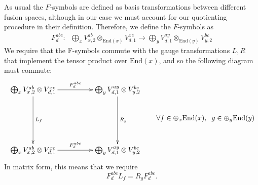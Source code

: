 \documentclass[12pt,a4paper]{article}
\newcounter{arrow}
\newcommand{\tp}{\otimes}
\newcommand\be            {\begin{equation}}
\newcommand\ee            {\end{equation}}
\newcommand{\End}{\text{End}}
\begin{document}
As usual the $F$-symbols are defined as basis transformations between different fusion spaces, although in our case we must account for our quotienting procedure in their definition. Therefore, we define the $F$-symbols as
\begin{align}
F^{abc}_d: \; \; \bigoplus_x V^{ab}_{x,2} \tp_{\text{End}(x)} V^{xc}_{d,1} \rightarrow \bigoplus_y V^{ay}_{d,1} \tp_{\text{End}(y)} V^{bc}_{y,2}
\end{align}
We require that the F-symbols commute with the gauge transformations $L,R$ that implement the tensor product over $\End(x)$, and so the following diagram must commute:
\begin{align}
	\vcenter{\xymatrix @!0 @M=1mm @R=30mm @C=42mm{
		 \bigoplus_x V^{ab}_{x,2} \otimes V^{xc}_{d,1} \ar[d]^{L_{f}}\ar[r]^{F^{abc}_d}& \bigoplus_y V^{ay}_{d,1} \otimes V^{bc}_{y,2} \ar[d]^{R_{g}} \\
		\bigoplus_x V^{ab}_{x,2} \otimes V^{xc}_{d,1}  \ar[r]^{F^{abc}_d}  & \bigoplus_y V^{ay}_{d,1} \otimes V^{bc}_{y,2}	
	}} 
	{ \quad\quad \forall f \in \oplus_x \text{End}(x), \; \; g \in \oplus_y \text{End}(y)}
	\label{Fcommute}
\end{align}
In matrix form, this means that we require 
\be
F^{abc}_d  L_f=   R_g F^{abc}_d.
\ee
\end{document}
